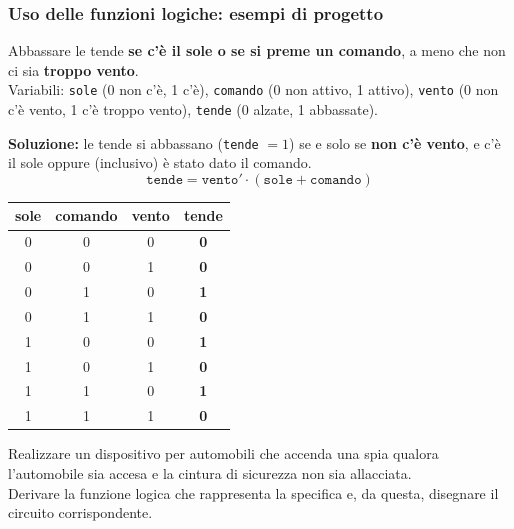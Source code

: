 \documentclass[12pt, a4paper]{article}
\begin{document}
\subsubsection{Uso delle funzioni logiche: esempi di progetto}

\begin{tcolorbox}[colback=lightergray!10, colframe=tocsec, title=\textbf{Esercizio: tende da sole}]
Abbassare le tende \textbf{se c'è il sole o se si preme un comando}, a meno che non ci sia \textbf{troppo vento}.\\
Variabili: \texttt{sole} (0 non c'è, 1 c'è), \texttt{comando} (0 non attivo, 1 attivo), \texttt{vento} (0 non c'è vento, 1 c'è troppo vento), \texttt{tende} (0 alzate, 1 abbassate).
\end{tcolorbox}

\textbf{Soluzione:} le tende si abbassano (\texttt{tende} $= 1$) se e solo se \textbf{non c'è vento}, e c'è il sole oppure (inclusivo) è stato dato il comando.
\[
\texttt{tende} = \texttt{vento}' \cdot (\texttt{sole} + \texttt{comando})
\]

\begin{center}
\renewcommand{\arraystretch}{1.25}
\begin{tabular}[t]{|ccc||c|}
\hline
\colorbox{gray!25}{\color{black}\textbf{sole}} & \colorbox{gray!25}{\color{black}\textbf{comando}} & \colorbox{gray!25}{\color{black}\textbf{vento}} & \colorbox{gray!25}{\color{black}\textbf{tende}} \\ \hline
0 & 0 & 0 & \textbf{0} \\ \hline
0 & 0 & 1 & \textbf{0} \\ \hline
0 & 1 & 0 & \textbf{1} \\ \hline
0 & 1 & 1 & \textbf{0} \\ \hline
1 & 0 & 0 & \textbf{1} \\ \hline
1 & 0 & 1 & \textbf{0} \\ \hline
1 & 1 & 0 & \textbf{1} \\ \hline
1 & 1 & 1 & \textbf{0} \\ \hline
\end{tabular}
\end{center}

\begin{tcolorbox}[colback=lightergray!10, colframe=tocsec, title=\textbf{Esercizio: spia della cintura di sicurezza}]
Realizzare un dispositivo per automobili che accenda una spia qualora l'automobile sia accesa e la cintura di sicurezza non sia allacciata.\\
Derivare la funzione logica che rappresenta la specifica e, da questa, disegnare il circuito corrispondente.
\end{tcolorbox}
\end{document}
